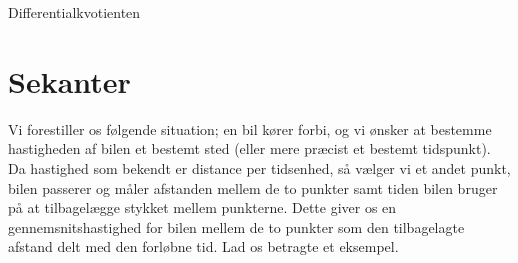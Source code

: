 
\begin{center}
	\Huge
	Differentialkvotienten
\end{center}


\section*{Sekanter}

Vi forestiller os følgende situation; en bil kører forbi, og vi ønsker at bestemme hastigheden af bilen et bestemt sted (eller mere præcist et bestemt tidspunkt). Da hastighed som bekendt er distance per tidsenhed, så vælger vi et andet punkt, bilen passerer og måler afstanden mellem de to punkter samt tiden bilen bruger på at tilbagelægge stykket mellem punkterne. Dette giver os en gennemsnitshastighed for bilen mellem de to punkter som den tilbagelagte afstand delt med den forløbne tid. Lad os betragte et eksempel.
